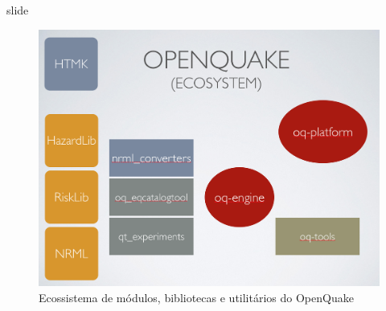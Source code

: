 \documentclass[ucs,8pt]{beamer}
\begin{document}
\begin{frame}{slide}

\begin{figure}[!h]
  \centering
  \includegraphics[height=.80\textheight]{oq_ecosystem} 
  \caption{Ecossistema de módulos, bibliotecas e utilitários do OpenQuake}
  \label{fig:oq} 
\end{figure}



\end{frame}
\end{document}
